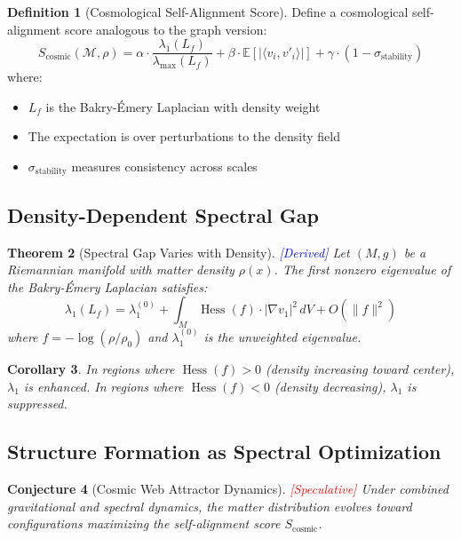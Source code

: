 \documentclass[11pt,a4paper]{article}
\theoremstyle{plain}
\newtheorem{theorem}{Theorem}[section]
\newtheorem{corollary}[theorem]{Corollary}
\newtheorem{conjecture}[theorem]{Conjecture}
\theoremstyle{definition}
\newtheorem{definition}[theorem]{Definition}
\theoremstyle{remark}
\newcommand{\Hess}{\operatorname{Hess}}
\newcommand{\derived}{\textcolor{blue}{[Derived]}}
\newcommand{\speculative}{\textcolor{red}{[Speculative]}}
\begin{document}
\begin{definition}[Cosmological Self-Alignment Score]
Define a cosmological self-alignment score analogous to the graph version:
\[
S_{\text{cosmic}}(\mathcal{M}, \rho) = \alpha \cdot \frac{\lambda_1(L_f)}{\lambda_{\max}(L_f)} + \beta \cdot \mathbb{E}[|\langle v_i, v'_i \rangle|] + \gamma \cdot (1 - \sigma_{\text{stability}})
\]
where:
\begin{itemize}[noitemsep]
    \item $L_f$ is the Bakry-\'{E}mery Laplacian with density weight
    \item The expectation is over perturbations to the density field
    \item $\sigma_{\text{stability}}$ measures consistency across scales
\end{itemize}
\end{definition}

\subsection{Density-Dependent Spectral Gap}

\begin{theorem}[Spectral Gap Varies with Density] \derived
Let $(M,g)$ be a Riemannian manifold with matter density $\rho(x)$. The first nonzero eigenvalue of the Bakry-\'{E}mery Laplacian satisfies:
\[
\lambda_1(L_f) = \lambda_1^{(0)} + \int_M \Hess(f) \cdot |\nabla v_1|^2 \, dV + O(\|f\|^2)
\]
where $f = -\log(\rho/\rho_0)$ and $\lambda_1^{(0)}$ is the unweighted eigenvalue.
\end{theorem}

\begin{corollary}
In regions where $\Hess(f) > 0$ (density increasing toward center), $\lambda_1$ is enhanced. In regions where $\Hess(f) < 0$ (density decreasing), $\lambda_1$ is suppressed.
\end{corollary}

\subsection{Structure Formation as Spectral Optimization}

\begin{conjecture}[Cosmic Web Attractor Dynamics] \speculative
Under combined gravitational and spectral dynamics, the matter distribution evolves toward configurations maximizing the self-alignment score $S_{\text{cosmic}}$.
\end{conjecture}
\end{document}
